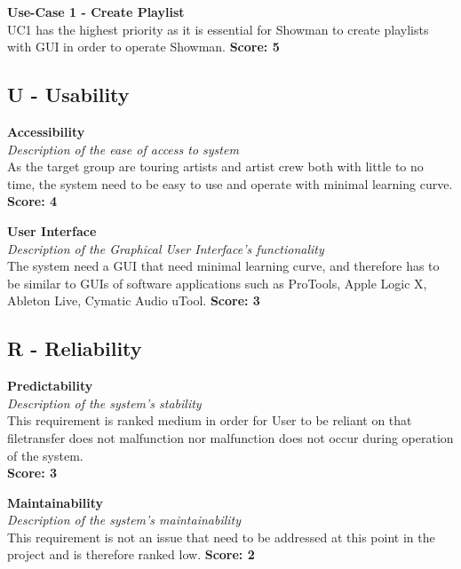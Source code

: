 \textbf{Use-Case 1 - Create Playlist} \\
UC1 has the highest priority as it is essential for Showman to create playlists with GUI in order to operate Showman. \newline
\textbf{Score: 5} \\

\subsection{\textbf{U} - Usability} 
\textbf{Accessibility} \\
\textit{Description of the ease of access to system} \\
As the target group are touring artists and artist crew both with little to no time, the system need to be easy to use and operate with minimal learning curve. \newline
\textbf{Score: 4} \newline

\textbf{User Interface} \\
\textit{Description of the Graphical User Interface's functionality} \\
The system need a GUI that need minimal learning curve, and therefore has to be similar to GUIs of software applications such as ProTools, Apple Logic X, Ableton Live, Cymatic Audio uTool. \newline
\textbf{Score: 3}

\subsection{\textbf{R} - Reliability} 
\textbf{Predictability} \\
\textit{Description of the system's stability} \\
This requirement is ranked medium in order for User to be reliant on that filetransfer does not malfunction nor malfunction does not occur during operation of the system. \\
\textbf{Score: 3} \newline

\textbf{Maintainability} \\
\textit{Description of the system's maintainability} \\
This requirement is not an issue that need to be addressed at this point in the project and is therefore ranked low. \newline
\textbf{Score: 2} \newline

